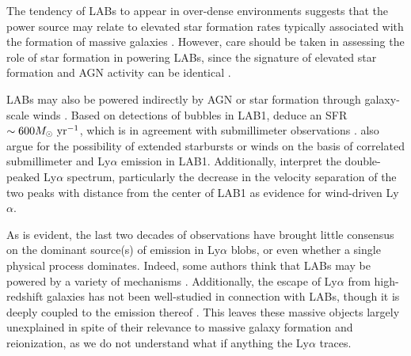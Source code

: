 The tendency of LABs to appear in over-dense environments \citep{Matsuda2009,Matsuda2011,Prescott2008} suggests that the power source may relate to elevated star formation rates typically associated with the formation of massive galaxies \citep[e.g.][]{Matsuda2007,Kubo2013,Hine2016,Alexander2016}.
However, care should be taken in assessing the role of star formation in powering LABs, since the signature of elevated star formation and AGN activity can be identical \citep{Webb2009}.

LABs may also be powered indirectly by AGN or star formation through galaxy-scale winds \citep{Wilman2005}.
Based on detections of bubbles in LAB1, \citet{Matsuda2004} deduce an SFR $\sim 600M_{\odot}\ \rm{yr}^{-1}$, which is in agreement with submillimeter observations \citep{Chapman2001}.
\citep{Matsuda2007} also argue for the possibility of extended starbursts or winds on the basis of correlated submillimeter and Ly$\alpha$ emission in LAB1.
Additionally, \citet{Ohyama2003} interpret the double-peaked Ly$\alpha$ spectrum, particularly the decrease in the velocity separation of the two peaks with distance from the center of LAB1 as evidence for wind-driven Ly$\alpha$.

As is evident, the last two decades of observations have brought little consensus on the dominant source(s) of emission in Ly$\alpha$ blobs, or even whether a single physical process dominates.
Indeed, some authors think that LABs may be powered by a variety of mechanisms \citet{Scarlata2009,Webb2009,Nilsson2006,Prescott2009,Ao2015}.
Additionally, the escape of Ly$\alpha$ from high-redshift galaxies has not been well-studied in connection with LABs, though it is deeply coupled to the emission thereof \citep{Smith2019}.
This leaves these massive objects largely unexplained in spite of their relevance to massive galaxy formation and reionization, as we do not understand what if anything the Ly$\alpha$ traces.

